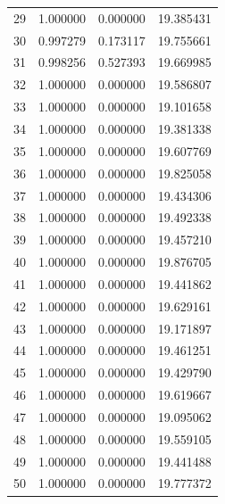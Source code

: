 \documentclass{article}
\begin{document}
\begin{tabular}{rrrr}
29 & 1.000000 & 0.000000 & 19.385431 \\
30 & 0.997279 & 0.173117 & 19.755661 \\
31 & 0.998256 & 0.527393 & 19.669985 \\
32 & 1.000000 & 0.000000 & 19.586807 \\
33 & 1.000000 & 0.000000 & 19.101658 \\
34 & 1.000000 & 0.000000 & 19.381338 \\
35 & 1.000000 & 0.000000 & 19.607769 \\
36 & 1.000000 & 0.000000 & 19.825058 \\
37 & 1.000000 & 0.000000 & 19.434306 \\
38 & 1.000000 & 0.000000 & 19.492338 \\
39 & 1.000000 & 0.000000 & 19.457210 \\
40 & 1.000000 & 0.000000 & 19.876705 \\
41 & 1.000000 & 0.000000 & 19.441862 \\
42 & 1.000000 & 0.000000 & 19.629161 \\
43 & 1.000000 & 0.000000 & 19.171897 \\
44 & 1.000000 & 0.000000 & 19.461251 \\
45 & 1.000000 & 0.000000 & 19.429790 \\
46 & 1.000000 & 0.000000 & 19.619667 \\
47 & 1.000000 & 0.000000 & 19.095062 \\
48 & 1.000000 & 0.000000 & 19.559105 \\
49 & 1.000000 & 0.000000 & 19.441488 \\
50 & 1.000000 & 0.000000 & 19.777372 \\
\bottomrule
\end{tabular}
\end{document}
